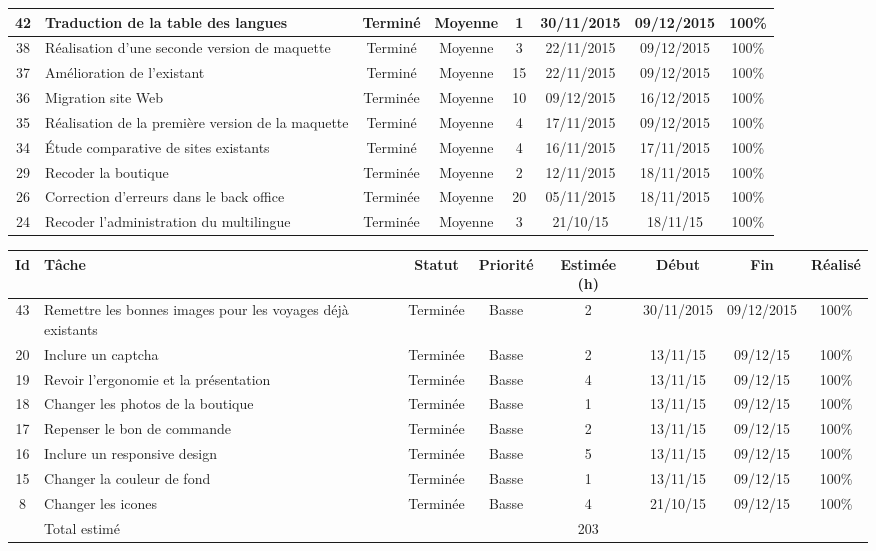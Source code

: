 \begin{tabular}{ | c | p{4cm} | c | c | c | c | c | c |  }
42 & Traduction de la table des langues & Terminé & Moyenne &  1 & 30/11/2015 &
09/12/2015 & 100\% \\ \hline
 38 & Réalisation d'une seconde version de maquette  & Terminé & Moyenne &  3 &
 22/11/2015 & 09/12/2015 & 100\% \\ \hline 
 37 & Amélioration de l'existant & Terminé & Moyenne &  15 & 22/11/2015 &
 09/12/2015 & 100\% \\ \hline 
 36 & Migration site Web & Terminée & Moyenne &  10 & 09/12/2015 & 16/12/2015
 & 100\% \\ \hline
  35 & Réalisation de la première version de la maquette & Terminé & Moyenne & 
  4 & 17/11/2015 & 09/12/2015 & 100\% \\ \hline 
  34 & Étude comparative de sites existants & Terminé & Moyenne &  4 &
  16/11/2015 & 17/11/2015 & 100\% \\ 
  \hline 29 & Recoder la boutique & Terminée & Moyenne & 2
	& 12/11/2015 & 18/11/2015 & 100\%  \\ \hline
26 & Correction d'erreurs dans le back office & Terminée &
Moyenne & 20 & 05/11/2015 & 18/11/2015 & 100\%  \\ \hline
24 & Recoder l'administration du
	multilingue & Terminée & Moyenne & 3 & 21/10/15 & 18/11/15 & 100\%  \\ 
\hline
	
	 \end{tabular}
	 \newpage
	\begin{tabular}{ | c | p{4cm} | c | c | c | c | c | c |  }
\hline 
Id & Tâche & Statut & Priorité & Estimée (h) & Début & Fin & Réalisé \\ \hline
43 &  Remettre les bonnes images pour les voyages déjà
existants & Terminée & Basse & 2 & 30/11/2015 & 09/12/2015 & 100\% \\ \hline
 20 & Inclure un captcha & Terminée & Basse & 2 & 13/11/15 &
	09/12/15 & 100\%  \\ \hline
19 & Revoir l'ergonomie et la présentation & Terminée & Basse & 4 & 13/11/15
	& 09/12/15 & 100\% \\ \hline
18 & Changer les photos de la boutique & Terminée & Basse & 1 & 13/11/15 &
	09/12/15 & 100\%  \\ \hline
17 & Repenser le bon de commande & Terminée & Basse & 2 & 13/11/15 & 09/12/15
	&  100\% \\ \hline
16 & Inclure un responsive design & Terminée & Basse & 5 &
	13/11/15 & 09/12/15 & 100\% \\ \hline
15 & Changer la couleur de fond & Terminée & Basse & 1 & 13/11/15 & 09/12/15
	& 100\%  \\ \hline
8 & Changer les icones & Terminée & Basse & 4 & 21/10/15 & 09/12/15 & 100\% \\
\hline

 & Total estimé &  &  & 203 &  &  & \\ \hline
 \end{tabular}